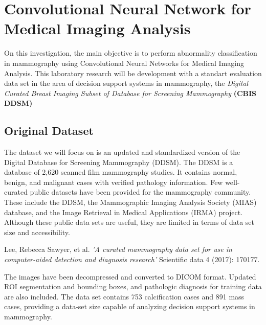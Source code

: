 \documentclass{book}
\begin{document}
    \chapter{Convolutional Neural Network for Medical Imaging Analysis}  %

    On this investigation, the main objective is to perform abnormality classification in mammography using Convolutional Neural Networks for Medical Imaging Analysis. This laboratory research will be development with a standart evaluation data set in the area of decision support systems in mammography, the \textit{Digital Curated Breast Imaging Subset of Database for Screening Mammography} \textbf{(CBIS DDSM)}
    
        \section{Original Dataset}
        The dataset we will focus on is an updated and standardized version of the Digital Database for Screening Mammography (DDSM). The DDSM is a database of 2,620 scanned film mammography studies. It contains normal, benign, and malignant cases with verified pathology information. Few well-curated public datasets have been provided for the mammography community. These include the DDSM, the Mammographic Imaging Analysis Society (MIAS) database, and the Image Retrieval in Medical Applications (IRMA) project. Although these public data sets are useful, they are limited in terms of data set size and accessibility.

        \begin{center}
            \begin{minipage}{0.9\linewidth}
                \vspace{5pt}%
                {\small
                    Lee, Rebecca Sawyer, et al. \textit{'A curated mammography data set for use in computer-aided detection and diagnosis research'} Scientific data 4 (2017): 170177.
                }
                \vspace{5pt}%
            \end{minipage}
        \end{center}

        The images have been decompressed and converted to DICOM format. Updated ROI segmentation and bounding boxes, and pathologic diagnosis for training data are also included. The data set contains 753 calcification cases and 891 mass cases, providing a data-set size capable of analyzing decision support systems in mammography.
\end{document}
